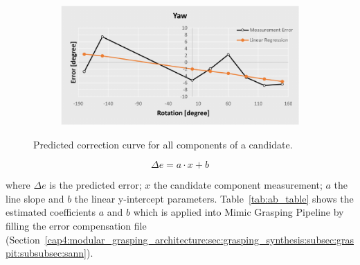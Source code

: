 \begin{figure}[h!]
{\begin{tcolorbox}
\begin{subfigure}[c]{.485\textwidth}
     \end{subfigure}
     \hfill
     \begin{subfigure}[c]{.485\textwidth}
         \centering
         \includegraphics[width=1\textwidth]{Cap5/Figuras/yaw_correction_asses.pdf}
     \end{subfigure}
    \end{tcolorbox}
    \caption{Predicted correction curve for all components of a candidate.}
    \label{fig:mimic_grasping_prediction_error_curve}
  }%
\end{figure}

\begin{equation}
   \Delta e = a\cdot x + b 
   \label{eq:linear_eq}
\end{equation}

where $\Delta e$ is the predicted error; $x$ the candidate component measurement; $a$ the line slope and $b$ the linear y-intercept parameters. Table~\ref{tab:ab_table} shows the estimated coefficients $a$ and $b$ which is applied into Mimic Grasping Pipeline by filling the error compensation file (Section~\ref{cap4:modular_grasping_architecture:sec:grasping_synthesis:subsec:graspit:subsubsec:sann}).

